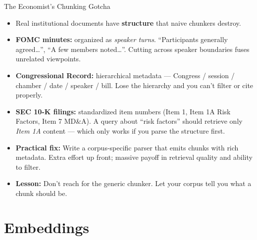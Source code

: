 \documentclass[10pt,english,aspectratio=169]{beamer}
\begin{document}
\begin{frame}{The Economist's Chunking Gotcha}
\begin{itemize}
\item Real institutional documents have \textbf{structure} that naive chunkers destroy.

\medskip
\item \textbf{FOMC minutes:} organized as \emph{speaker turns}. ``Participants generally agreed\dots'', ``A few members noted\dots''. Cutting across speaker boundaries fuses unrelated viewpoints.

\medskip
\item \textbf{Congressional Record:} hierarchical metadata --- Congress / session / chamber / date / speaker / bill. Lose the hierarchy and you can't filter or cite properly.

\medskip
\item \textbf{SEC 10-K filings:} standardized item numbers (Item 1, Item 1A Risk Factors, Item 7 MD\&A). A query about ``risk factors'' should retrieve only \emph{Item 1A} content --- which only works if you parse the structure first.

\medskip
\item \textbf{Practical fix:} Write a corpus-specific parser that emits chunks with rich metadata. Extra effort up front; massive payoff in retrieval quality and ability to filter.

\medskip
\item \textbf{Lesson:} Don't reach for the generic chunker. Let your corpus tell you what a chunk should be.
\end{itemize}
\end{frame}

\section{Embeddings}
\end{document}
